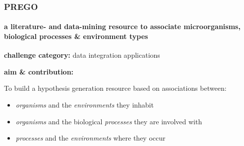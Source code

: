 \documentclass{beamer}
\begin{document}
   \begin{darkframes}
      \begin{frame}
         \frametitle{ \textbf{PREGO} }
         \framesubtitle{a literature- and data-mining resource to associate microorganisms,
         biological processes \& environment types}



         \small
         \textbf{challenge category:} 
         data integration applications

         \bigskip

         \textbf{aim \& contribution:}

            To build a hypothesis generation resource based on associations between: 
            \begin{itemize}
               \item \textit{organisms} and the \textit{environments} they inhabit
               \item \textit{organisms} and the biological \textit{processes} they are involved with
               \item \textit{processes} and the \textit{environments} where they occur
            \end{itemize}


      \end{frame}
   \end{darkframes}
\end{document}
